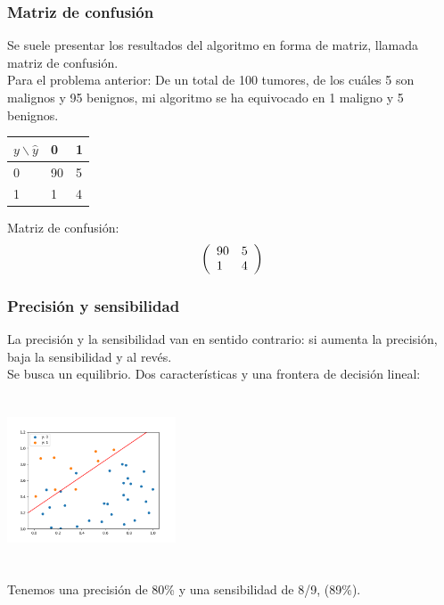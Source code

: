 \documentclass{beamer}
\begin{document}
\begin{frame}
  \frametitle{Matriz de confusión}
  Se suele presentar los resultados del algoritmo en forma de matriz,
  llamada matriz de confusión.\\ 
  Para el problema anterior: De un total de 100 tumores, de los cuáles 5 son malignos y 95
  benignos, mi algoritmo se ha equivocado en 1 maligno y 5 benignos.
\begin{center}
  \begin{tabular}[h]{l||ll}
      $y \backslash \hat y$&0&1\\ \hline\hline
      0&90&5\\
      1&1&4\\
    \end{tabular}
  \end{center}
  Matriz de confusión:
   $$\left(
     \begin{array}[h]{ll}
       90&5\\
       1&4\\
     \end{array}
   \right)$$
 \end{frame}
 \begin{frame}
   \frametitle{Precisión y sensibilidad}
   La precisión y la sensibilidad van en sentido contrario: si aumenta
   la precisión, baja la sensibilidad y al revés.\\
   Se busca un equilibrio.
   Dos características y una frontera de decisión lineal:\\
   \begin{center}
     \includegraphics[height=5cm,width=5cm]{precision_recall.png}
   \end{center}
         Tenemos una precisión de 80\% y una sensibilidad de 8/9, (89\%).

   
 \end{frame}
\end{document}
